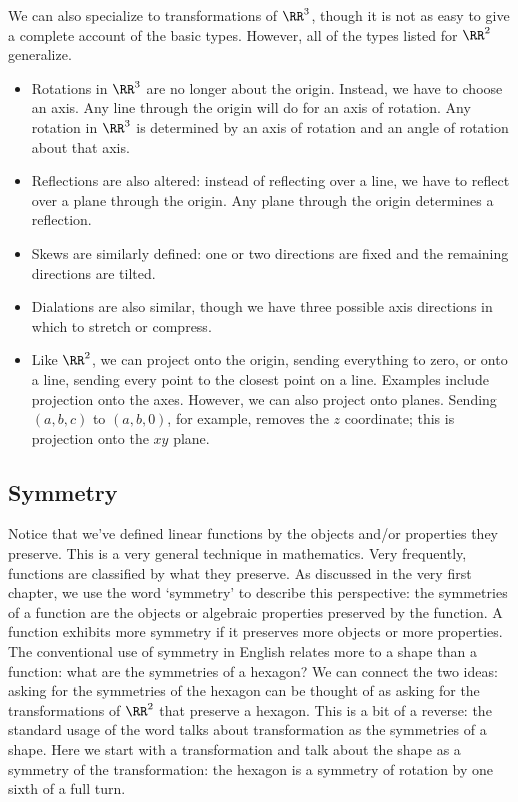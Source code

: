\documentclass[fleqn]{report}
\begin{document}
We can also specialize to transformations of $\RR^3$, though it
is not as easy to give a complete account of the basic types.
However, all of the types listed for $\RR^2$ generalize.

\begin{itemize}
\item Rotations in $\RR^3$ are no longer about the origin.
Instead, we have to choose an axis. Any line through the origin
will do for an axis of rotation. Any rotation in $\RR^3$ is
determined by an axis of rotation and an angle of rotation about
that axis.
\item Reflections are also altered: instead of reflecting over a
line, we have to reflect over a plane through the origin. Any
plane through the origin determines a reflection.
\item Skews are similarly defined: one or two directions are
fixed and the remaining directions are tilted.
\item Dialations are also similar, though we have three possible
axis directions in which to stretch or compress.
\item Like $\RR^2$, we can project onto the origin, sending
everything to zero, or onto a line, sending every point to the
closest point on a line. Examples include projection
onto the axes. However, we can also project onto planes.
Sending $(a,b,c)$ to $(a,b,0)$, for example, removes the $z$
coordinate; this is projection onto the $xy$ plane.
\end{itemize}

\subsection{Symmetry}
\label{transformations-symmetry}

Notice that we've defined linear functions by the objects
and/or properties they preserve. This is a very general
technique in mathematics. Very frequently, functions are
classified by what they preserve. As discussed in the very
first chapter, we use the word `symmetry' to describe this
perspective: the symmetries of a function are the objects or
algebraic properties preserved by the function. A function
exhibits more symmetry if it preserves more objects or more
properties. The conventional use of symmetry in English
relates more to a shape than a function: what are the
symmetries of a hexagon? We can connect the two ideas: asking
for the symmetries of the hexagon can be thought of as asking
for the transformations of $\RR^2$ that preserve a hexagon.
This is a bit of a reverse: the standard usage of the word
talks about transformation as the symmetries of a shape. Here
we start with a transformation and talk about the shape as a
symmetry of the transformation: the hexagon is a symmetry of
rotation by one sixth of a full turn.
\end{document}
